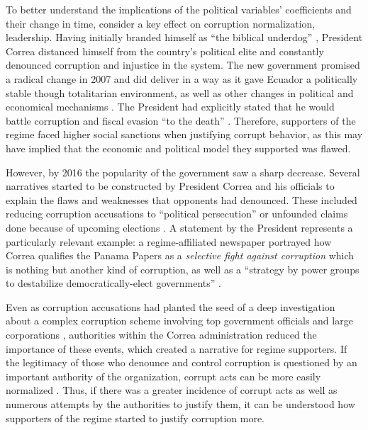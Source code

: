 \documentclass[12pt,a4]{article}\usepackage[]{graphicx}\usepackage[]{xcolor}
\begin{document}
To better understand the implications of the political variables' coefficients and their change in time, consider a key effect on corruption normalization, leadership. Having initially branded himself as \enquote{the biblical underdog} \parencite[para. 4]{Hedgecoe.2009}, President Correa distanced himself from the country's political elite and constantly denounced corruption and injustice in the system. The new government promised a radical change in 2007 and did deliver in a way as it gave Ecuador a politically stable though totalitarian environment, as well as other changes in political and economical mechanisms \parencite{Weisbrot.2017}. The President had explicitly stated that he would battle corruption and fiscal evasion \enquote{to the death} \parencite{Ortiz.2013}. Therefore, supporters of the regime faced higher social sanctions when justifying corrupt behavior, as this may have implied that the economic and political model they supported was flawed.

However, by 2016 the popularity of the government saw a sharp decrease. Several narratives started to be constructed by President Correa and his officials to explain the flaws and weaknesses that opponents had denounced. These included reducing corruption accusations to \enquote{political persecution} or unfounded claims done because of upcoming elections \parencite{Melendez.2017}. A statement by the President represents a particularly relevant example: a regime-affiliated newspaper portrayed how Correa qualifies the Panama Papers as a \textit{selective fight against corruption} which is nothing but another kind of corruption, as well as a \enquote{strategy by power groups to destabilize democratically-elect governments} \parencite[para. 5-7]{Telegrafo.2016}. 

Even as corruption accusations had planted the seed of a deep investigation about a complex corruption scheme involving top government officials and large corporations \parencite{Villavicencio.2019}, authorities within the Correa administration reduced the importance of these events, which created a narrative for regime supporters. If the legitimacy of those who denounce and control corruption is questioned by an important authority of the organization, corrupt acts can be more easily normalized \parencite{Ashforth.2003}. Thus, if there was a greater incidence of corrupt acts as well as numerous attempts by the authorities to justify them, it can be understood how supporters of the regime started to justify corruption more.
\end{document}
